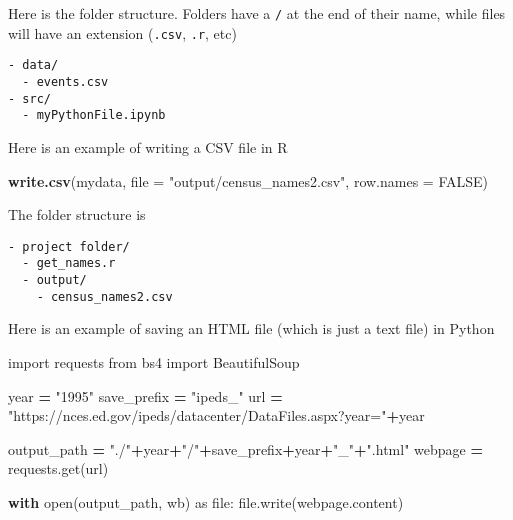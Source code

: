 \documentclass[
]{book}
\newenvironment{Shaded}{\begin{snugshade}}{\end{snugshade}}
\newcommand{\AttributeTok}[1]{\textcolor[rgb]{0.13,0.29,0.53}{#1}}
\newcommand{\BuiltInTok}[1]{#1}
\newcommand{\ConstantTok}[1]{\textcolor[rgb]{0.56,0.35,0.01}{#1}}
\newcommand{\ControlFlowTok}[1]{\textcolor[rgb]{0.13,0.29,0.53}{\textbf{#1}}}
\newcommand{\FunctionTok}[1]{\textcolor[rgb]{0.13,0.29,0.53}{\textbf{#1}}}
\newcommand{\ImportTok}[1]{#1}
\newcommand{\NormalTok}[1]{#1}
\newcommand{\OperatorTok}[1]{\textcolor[rgb]{0.81,0.36,0.00}{\textbf{#1}}}
\newcommand{\StringTok}[1]{\textcolor[rgb]{0.31,0.60,0.02}{#1}}
\begin{document}
Here is the folder structure. Folders have a \texttt{/} at the end of their name, while
files will have an extension (\texttt{.csv}, \texttt{.r}, etc)

\begin{verbatim}
- data/
  - events.csv
- src/
  - myPythonFile.ipynb
\end{verbatim}

Here is an example of writing a CSV file in R

\begin{Shaded}
\begin{Highlighting}[]
\FunctionTok{write.csv}\NormalTok{(mydata, }\AttributeTok{file =} \StringTok{"output/census\_names2.csv"}\NormalTok{, }\AttributeTok{row.names =} \ConstantTok{FALSE}\NormalTok{)}
\end{Highlighting}
\end{Shaded}

The folder structure is

\begin{verbatim}
- project folder/
  - get_names.r
  - output/
    - census_names2.csv
\end{verbatim}

Here is an example of saving an HTML file (which is just a text file) in Python

\begin{Shaded}
\begin{Highlighting}[]
\ImportTok{import}\NormalTok{ requests}
\ImportTok{from}\NormalTok{ bs4 }\ImportTok{import}\NormalTok{ BeautifulSoup}

\NormalTok{year }\OperatorTok{=} \StringTok{"1995"}
\NormalTok{save\_prefix }\OperatorTok{=} \StringTok{"ipeds\_"} 
\NormalTok{url }\OperatorTok{=} \StringTok{"https://nces.ed.gov/ipeds/datacenter/DataFiles.aspx?year="}\OperatorTok{+}\NormalTok{year}

\NormalTok{output\_path }\OperatorTok{=} \StringTok{"./"}\OperatorTok{+}\NormalTok{year}\OperatorTok{+}\StringTok{"/"}\OperatorTok{+}\NormalTok{save\_prefix}\OperatorTok{+}\NormalTok{year}\OperatorTok{+}\StringTok{"\_"}\OperatorTok{+}\StringTok{".html"}
\NormalTok{webpage }\OperatorTok{=}\NormalTok{ requests.get(url)}

\ControlFlowTok{with} \BuiltInTok{open}\NormalTok{(output\_path, }\StringTok{\textquotesingle{}wb\textquotesingle{}}\NormalTok{) }\ImportTok{as} \BuiltInTok{file}\NormalTok{:}
  \BuiltInTok{file}\NormalTok{.write(webpage.content) }
\end{Highlighting}
\end{Shaded}
\end{document}

